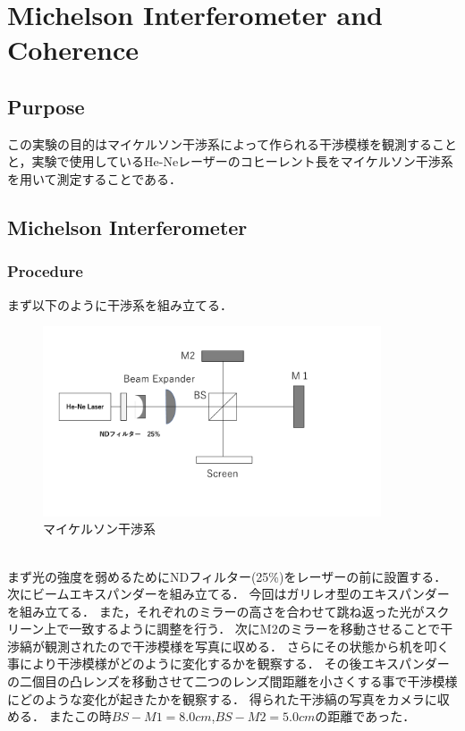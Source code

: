 \documentclass[11pt, a4paper]{jsarticle}
\begin{document}
\section{Michelson Interferometer and Coherence}
\subsection*{Purpose}
この実験の目的はマイケルソン干渉系によって作られる干渉模様を観測することと，実験で使用しているHe-Neレーザーのコヒーレント長をマイケルソン干渉系を用いて測定することである．
\subsection{Michelson Interferometer}
\subsubsection{Procedure}
まず以下のように干渉系を組み立てる．
\begin{figure}[htbp]
 \begin{center}
  \includegraphics[width=100mm]{fig14.png}
 \end{center}
 \caption{マイケルソン干渉系}
 \label{fig:14}
\end{figure}\\

まず光の強度を弱めるためにNDフィルター(25\%)をレーザーの前に設置する．
次にビームエキスパンダーを組み立てる．
今回はガリレオ型のエキスパンダーを組み立てる．
また，それぞれのミラーの高さを合わせて跳ね返った光がスクリーン上で一致するように調整を行う．
次にM2のミラーを移動させることで干渉縞が観測されたので干渉模様を写真に収める．
さらにその状態から机を叩く事により干渉模様がどのように変化するかを観察する．
その後エキスパンダーの二個目の凸レンズを移動させて二つのレンズ間距離を小さくする事で干渉模様にどのような変化が起きたかを観察する．
得られた干渉縞の写真をカメラに収める．
またこの時$BS-M1 = 8.0cm$,$BS-M2 = 5.0cm$の距離であった．
\end{document}
